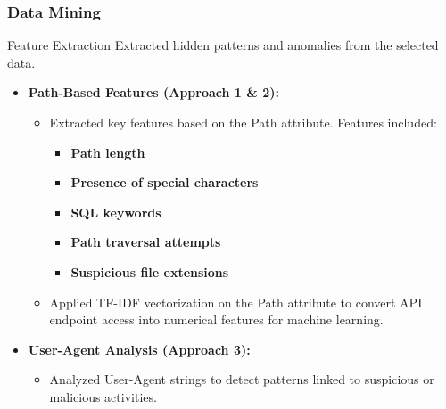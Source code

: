 \documentclass[10pt, a4paper]{beamer}
\begin{document}
	\begin{frame}
		\frametitle{Data Mining}
		
		\begin{block}{Feature Extraction}
			Extracted hidden patterns and anomalies from the selected data.
			\begin{itemize}
				\item \textbf{Path-Based Features (Approach 1 \& 2):}
				\begin{itemize}
					\item Extracted key features based on the Path attribute. Features included:
					\begin{itemize}
						\item \textbf{Path length}
						\item \textbf{Presence of special characters}
						\item \textbf{SQL keywords}
						\item \textbf{Path traversal attempts}
						\item \textbf{Suspicious file extensions}
					\end{itemize}
					\item Applied TF-IDF vectorization on the Path attribute to convert API endpoint access into numerical features for machine learning.
				\end{itemize}
				
				\item \textbf{User-Agent Analysis (Approach 3):}
				\begin{itemize}
					\item Analyzed User-Agent strings to detect patterns linked to suspicious or malicious activities.
				\end{itemize}
			\end{itemize}
		\end{block}
	\end{frame}
	
\end{document}
